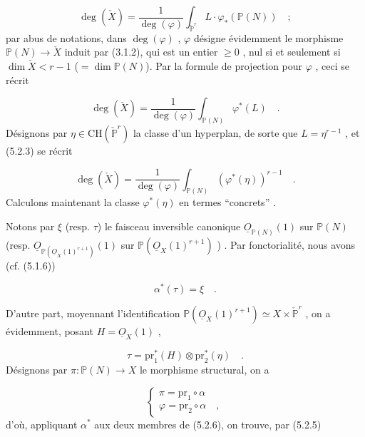 \begin{equation}\tag{5.2.2}
\deg(\check{X}) = \frac{1}{\deg(\varphi)} \int_{\check{\mathbb{P}}^r} L\cdot\varphi_*( \mathbb{P}(N)) \quad ;
\end{equation}
par abus de notations, dans $\deg(\varphi)$ , $\varphi$ désigne évidemment le morphisme $\mathbb{P}(N) \longrightarrow \check{X}$ induit par (3.1.2), qui est un entier $\geqslant 0$ , nul si et seulement si $\dim \check{X} < r-1$ ($=\dim \mathbb{P}(N)$). Par la formule de projection pour $\varphi$ , ceci se récrit

\begin{equation}\tag{5.2.3}
\deg(\check{X}) = \frac{1}{\deg(\varphi)} \int_{\mathbb{P}(N)} \varphi^*(L) \quad .
\end{equation}
Désignons par $\eta \in \mathrm{CH}( \check{\mathbb{P}}^r)$ la classe d'un hyperplan, de sorte que $L = \eta^{r-1}$ , et (5.2.3) se récrit

\begin{equation}\tag{5.2.4}
\deg(\check{X}) = \frac{1}{\deg(\varphi)} \int_{\mathbb{P}(N)} (\varphi^*(\eta))^{r-1} \quad .
\end{equation}
Calculons maintenant la classe $\varphi^*(\eta)$ en termes ``concrets'' .

Notons par $\xi$ (resp. $\tau$) le faisceau inversible canonique $\underline{O}_{\mathbb{P}(N)}(1)$ sur $\mathbb{P}(N)$ (resp. $\underline{O}_{\mathbb{P}(\underline{O}_X(1)^{r+1})}(1)$ sur $\mathbb{P}(\underline{O}_X(1)^{r+1})$ ) . Par fonctorialité, nous avons (cf. (5.1.6))

\begin{equation}\tag{5.2.5}
\alpha^*(\tau) = \xi \quad .
\end{equation}


D'autre part, moyennant l'identification $\mathbb{P}(\underline{O}_X(1)^{r+1}) \simeq X \times \check{\mathbb{P}}^r$ , on a évidemment, posant $H = \underline{O}_X(1)$ ,

\begin{equation}\tag{5.2.6}
\tau = \mathrm{pr}_1^*(H) \otimes \mathrm{pr}_2^*(\eta) \quad .
\end{equation}
Désignons par $\pi : \mathbb{P}(N) \longrightarrow X$ le morphisme structural, on a

\begin{equation*}
\begin{cases} \pi = \mathrm{pr}_1 \circ \alpha \\ \varphi = \mathrm{pr}_2 \circ \alpha \quad , \end{cases}
\end{equation*}
d'où, appliquant $\alpha^*$ aux deux membres de (5.2.6), on trouve, par (5.2.5)


